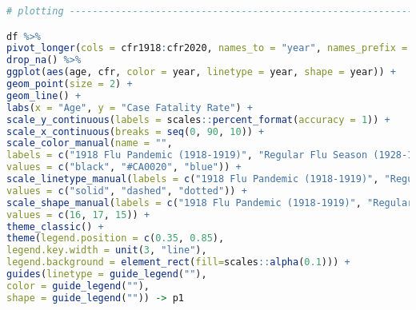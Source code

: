 \begin{lstlisting}[language=R,caption={Data Preparation and Plotting for Figure \ref{fig_cfr}: Case Fatality Rates of Pneumonia and Influenza during the 1918 Flu Pandemic, 1928, and Covid-19 in 2020}, label=lst_cfr]
# plotting ----------------------------------------------------------------

df %>% 
pivot_longer(cols = cfr1918:cfr2020, names_to = "year", names_prefix = "cfr", values_to = "cfr") %>% 
drop_na() %>%
ggplot(aes(age, cfr, color = year, linetype = year, shape = year)) +
geom_point(size = 2) +
geom_line() +
labs(x = "Age", y = "Case Fatality Rate") +
scale_y_continuous(labels = scales::percent_format(accuracy = 1)) +
scale_x_continuous(breaks = seq(0, 90, 10)) +
scale_color_manual(name = "",
labels = c("1918 Flu Pandemic (1918-1919)", "Regular Flu Season (1928-1929)", "Covid-19 (2020)"),
values = c("black", "#CA0020", "blue")) +
scale_linetype_manual(labels = c("1918 Flu Pandemic (1918-1919)", "Regular Flu Season (1928-1929)", "Covid-19 (2020)"),
values = c("solid", "dashed", "dotted")) +
scale_shape_manual(labels = c("1918 Flu Pandemic (1918-1919)", "Regular Flu Season (1928-1929)", "Covid-19 (2020)"),
values = c(16, 17, 15)) +
theme_classic() +
theme(legend.position = c(0.35, 0.85),
legend.key.width = unit(3, "line"),
legend.background = element_rect(fill=scales::alpha(0.1))) +
guides(linetype = guide_legend(""),
color = guide_legend(""),
shape = guide_legend("")) -> p1

\end{lstlisting}